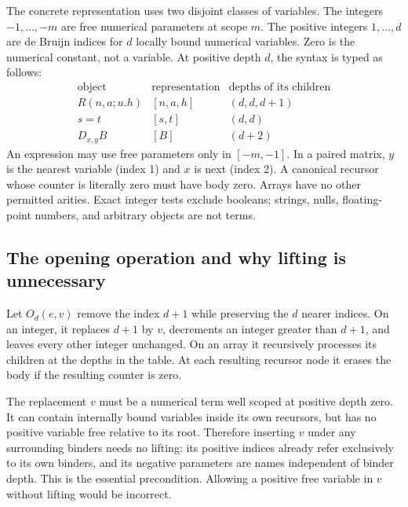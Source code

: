 \documentclass[11pt,letterpaper]{article}
\theoremstyle{definition}\newtheorem{definition}[theorem]{Definition}
\begin{document}
The concrete representation uses two disjoint classes of variables.
The integers $-1,\ldots,-m$ are free numerical parameters at scope $m$.
The positive integers $1,\ldots,d$ are de Bruijn indices for $d$ locally
bound numerical variables. Zero is the numerical constant, not a variable.
At positive depth $d$, the syntax is typed as follows:
\[
\begin{array}{c|c|c}
\text{object}&\text{representation}&\text{depths of its children}\\\hline
R(n,a;u.h)&[n,a,h]&(d,d,d+1)\\
s=t&[s,t]&(d,d)\\
D_{x,y}B&[B]&(d+2)
\end{array}
\]
An expression may use free parameters only in $[-m,-1]$. In a paired
matrix, $y$ is the nearest variable (index 1) and $x$ is next (index 2).
A canonical recursor whose counter is literally zero must have body zero.
Arrays have no other permitted arities. Exact integer tests exclude
booleans; strings, nulls, floating-point numbers, and arbitrary objects
are not terms.

\subsection{The opening operation and why lifting is unnecessary}

Let $O_d(e,v)$ remove the index $d+1$ while preserving the $d$ nearer
indices. On an integer, it replaces $d+1$ by $v$, decrements an integer
greater than $d+1$, and leaves every other integer unchanged. On an
array it recursively processes its children at the depths in the table.
At each resulting recursor node it erases the body if the resulting
counter is zero.

The replacement $v$ must be a numerical term well scoped at positive
depth zero. It can contain internally bound variables inside its own
recursors, but has no positive variable free relative to its root.
Therefore inserting $v$ under any surrounding binders needs no lifting:
its positive indices already refer exclusively to its own binders, and
its negative parameters are names independent of binder depth. This
is the essential precondition. Allowing a positive free variable in
$v$ without lifting would be incorrect.
\end{document}
